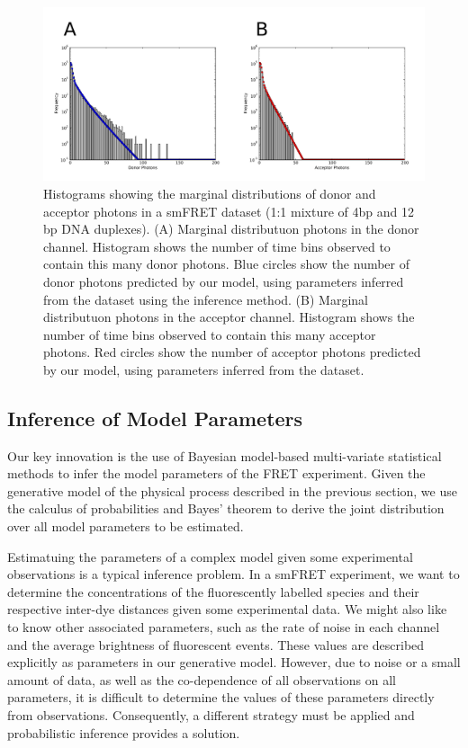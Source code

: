 \begin{figure}
   \begin{center}
      \includegraphics*[width=6in]{inference/marginal_distributions.pdf}
      \caption{Histograms showing the marginal distributions of donor and acceptor photons in a smFRET dataset (1:1 mixture of 4bp and 12 bp DNA duplexes). (A) Marginal distributuon photons in the donor channel. Histogram shows the number of time bins observed to contain this many donor photons. Blue circles show the number of donor photons predicted by our model, using parameters inferred from the dataset using the inference method. (B) Marginal distributuon photons in the acceptor channel. Histogram shows the number of time bins observed to contain this many acceptor photons. Red circles show the number of acceptor photons predicted by our model, using parameters inferred from the dataset.}
      \label{fig:marginals}
   \end{center}
\end{figure}


\subsection*{Inference of Model Parameters}
Our key innovation is the use of Bayesian model-based multi-variate statistical methods to infer the model parameters of the FRET experiment. Given the generative model of the physical process described in the previous section, we use the calculus of probabilities and Bayes' theorem to derive the joint distribution over all model parameters to be estimated.

Estimatuing the parameters of a complex model given some experimental observations is a typical inference problem. In a smFRET experiment, we want to determine the concentrations of the fluorescently labelled species and their respective inter-dye distances given some experimental data. We might also like to know other associated parameters, such as the rate of noise in each channel and the average brightness of fluorescent events. These values are described explicitly as parameters in our generative model. However, due to noise or a small amount of data, as well as the co-dependence of all observations on all parameters, it is difficult to determine the values of these parameters directly from observations. Consequently, a different strategy must be applied and probabilistic inference provides a solution.

